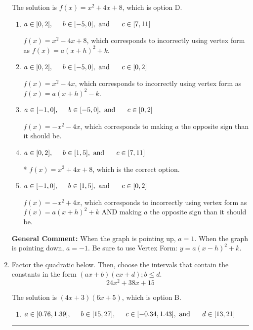 \documentclass{extbook}[14pt]
\newcommand{\litem}[1]{\item #1

\rule{\textwidth}{0.4pt}}
\begin{document}
\begin{enumerate}
{The solution is \( f(x) = x^{2} +4 x + 8 \), which is option D.\begin{enumerate}[label=\Alph*.]
\item \( a \in [0, 2], \hspace*{5mm} b \in [-5, 0], \text{ and } \hspace*{5mm} c \in [7, 11] \)

$f(x)=x^{2} -4 x + 8$, which corresponds to incorrectly using vertex form as $f(x) = a(x+h)^2+k$.
\item \( a \in [0, 2], \hspace*{5mm} b \in [-5, 0], \text{ and } \hspace*{5mm} c \in [0, 2] \)

$f(x)=x^{2} -4 x$, which corresponds to incorrectly using vertex form as $f(x) = a(x+h)^2 - k$.
\item \( a \in [-1, 0], \hspace*{5mm} b \in [-5, 0], \text{ and } \hspace*{5mm} c \in [0, 2] \)

$f(x)=-x^{2} -4 x$, which corresponds to making $a$ the opposite sign than it should be.
\item \( a \in [0, 2], \hspace*{5mm} b \in [1, 5], \text{ and } \hspace*{5mm} c \in [7, 11] \)

* $f(x)=x^{2} +4 x + 8$, which is the correct option.
\item \( a \in [-1, 0], \hspace*{5mm} b \in [1, 5], \text{ and } \hspace*{5mm} c \in [0, 2] \)

$f(x)=-x^{2} +4 x$, which corresponds to incorrectly using vertex form as $f(x) = a(x+h)^2+k$ AND making $a$ the opposite sign than it should be.
\end{enumerate}

\textbf{General Comment:} When the graph is pointing up, $a=1$. When the graph is pointing down, $a=-1$. Be sure to use Vertex Form: $y = a(x-h)^2+k$.
}
\litem{
Factor the quadratic below. Then, choose the intervals that contain the constants in the form $(ax+b)(cx+d); b \leq d.$
\[ 24x^{2} +38 x + 15 \]

The solution is \( (4x + 3)(6x + 5) \), which is option B.\begin{enumerate}[label=\Alph*.]
\item \( a \in [0.76, 1.39], \hspace*{5mm} b \in [15, 27], \hspace*{5mm} c \in [-0.34, 1.43], \text{ and } \hspace*{5mm} d \in [13, 21] \)


\end{enumerate}}
\end{enumerate}
\end{document}
